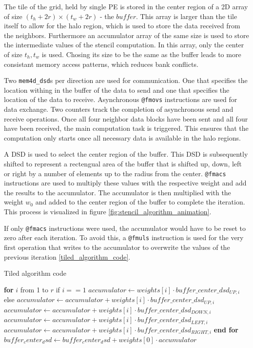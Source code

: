 \documentclass{article}
\begin{document}
The tile of the grid, held by single PE is stored in the center region of a 2D array of size $(t_h+2r)\times (t_w+2r)$ - the $buffer$. This array is larger than the tile itself to allow for the halo region, which is used to store the data received from the neighbors. Furthermore an accumulator array of the same size is used to store the intermediate values of the stencil computation. In this array, only the center of size $t_h, t_w$ is used. Chosing its size to be the same as the buffer leads to more consistant memory access patterns, which reduces bank conflicts.

Two \texttt{mem4d\_dsd}s per direction are used for communication. One that specifies the location withing in the buffer of the data to send and one that specifies the location of the data to receive.
Asynchronous \texttt{@fmovs} instructions are used for data exchange. Two counters track the completion of asynchronous send and receive operations. Once all four neighbor data blocks have been sent and all four have been received, the main computation task is triggered. This ensures that the computation only starts once all necessary data is available in the halo regions.

A DSD is used to select the center region of the buffer. This DSD is subsequently shifted to represent a rectengual area of the buffer that is shifted up, down, left or right by a number of elements up to the radius from the center. \texttt{@fmacs} instructions are used to multiply these values with the respective weight and add the results to the accumulator. The accumulator is then multiplied with the weight $w_0$ and added to the center region of the buffer to complete the iteration. This process is visualized in figure \ref{fig:stencil_algorithm_animation}.

If only \texttt{@fmacs} instructions were used, the accumulator would have to be reset to zero after each iteration. To avoid this, a \texttt{@fmuls} instruction is used for the very first operation that writes to the accumulator to overwrite the values of the previous iteration \ref{tiled_algorithm_code}.

\begin{algorithm}
    \caption{Tiled algorithm code}
    \begin{algorithmic}[1]
        \State \textbf{for} $i$ from 1 to $r$
        \State \quad if $i==1$
        \State \quad \quad $accumulator \gets weights[i] \cdot buffer\_center\_dsd_{UP,i}$
        \State \quad else
        \State \quad \quad $accumulator \gets accumulator + weights[i] \cdot buffer\_center\_dsd_{UP,i}$
        \State \quad $accumulator \gets accumulator + weights[i] \cdot buffer\_center\_dsd_{DOWN,i}$
        \State \quad $accumulator \gets accumulator + weights[i] \cdot buffer\_center\_dsd_{LEFT,i}$
        \State \quad $accumulator \gets accumulator + weights[i] \cdot buffer\_center\_dsd_{RIGHT,i}$
        \State \textbf{end for}
        \State \quad $buffer_center_dsd \gets buffer_center_dsd + weights[0] \cdot accumulator$
    \end{algorithmic}
\end{algorithm}
\end{document}
